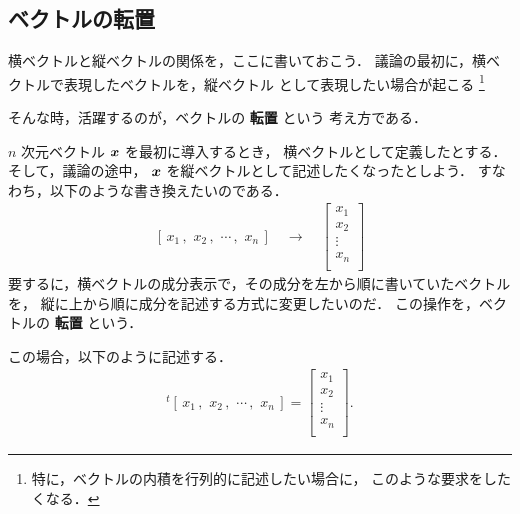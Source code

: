 ﻿        %
        \subsection{ベクトルの転置}
            横ベクトルと縦ベクトルの関係を，ここに書いておこう．
            議論の最初に，横ベクトルで表現したベクトルを，縦ベクトル
            として表現したい場合が起こる
                \footnote{
                    特に，ベクトルの内積を行列的に記述したい場合に，
                    このような要求をしたくなる．
                }

            そんな時，活躍するのが，ベクトルの \textbf{転置} という
            考え方である．

            $n$ 次元ベクトル $\boldsymbol{x}$ を最初に導入するとき，
            横ベクトルとして定義したとする．そして，議論の途中，
            $\boldsymbol{x}$ を縦ベクトルとして記述したくなったとしよう．
            すなわち，以下のような書き換えたいのである．
            \begin{align*}
                \left[\,x_{1}\,,\,\,x_{2}\,,\,\,\cdots\,,\,\,x_{n}\,\right]
                \quad \rightarrow \quad
                \left[
                    \begin{array}{c}
                        x_{1} \\
                        x_{2} \\
                        \vdots \\
                        x_{n} \\
                    \end{array}
                \right]
            \end{align*}
            要するに，横ベクトルの成分表示で，その成分を左から順に書いていたベクトルを，
            縦に上から順に成分を記述する方式に変更したいのだ．
            この操作を，ベクトルの \textbf{転置} という．

            この場合，以下のように記述する．
            \begin{align}
                {}^{t}\left[\,x_{1}\,,\,\,x_{2}\,,\,\,\cdots\,,\,\,x_{n}\,\right]
                =
                \left[
                    \begin{array}{c}
                        x_{1} \\
                        x_{2} \\
                        \vdots \\
                        x_{n} \\
                    \end{array}
                \right].
            \end{align}

